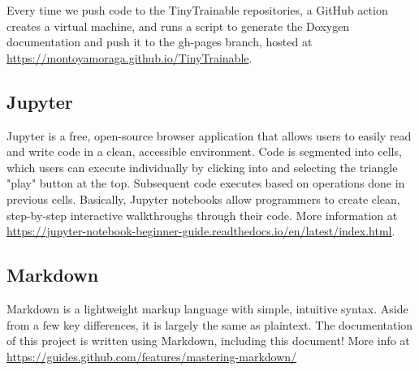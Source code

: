 Every time we push code to the TinyTrainable repositories, a GitHub action creates a virtual machine, and runs a script to generate the Doxygen documentation and push it to the gh-pages branch, hosted at \url{https://montoyamoraga.github.io/TinyTrainable}.

\subsection{Jupyter}

Jupyter is a free, open-source browser application that allows users to easily read and write code in a clean, accessible environment. Code is segmented into cells, which users can execute individually by clicking into and selecting the triangle "play" button at the top. Subsequent code executes based on operations done in previous cells. Basically, Jupyter notebooks allow programmers to create clean, step-by-step interactive walkthroughs through their code. More information at \url{https://jupyter-notebook-beginner-guide.readthedocs.io/en/latest/index.html}.
\subsection{Markdown}

Markdown is a lightweight markup language with simple, intuitive syntax. Aside from a few key differences, it is largely the same as plaintext. The documentation of this project is written using Markdown, including this document! More info at \url{https://guides.github.com/features/mastering-markdown/}
